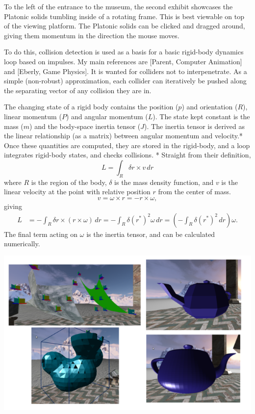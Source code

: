 \documentclass{article}
\begin{document}
To the left of the entrance to the museum, the second exhibit showcases the Platonic solids tumbling inside of a rotating frame. This is best viewable on top of the viewing platform.
The Platonic solids can be clicked and dragged around, giving them momentum in the direction the mouse moves.

To do this, collision detection is used as a basis for a basic rigid-body dynamics loop based on impulses. My main references are [Parent, Computer Animation] and [Eberly, Game Physics].
It is wanted for colliders not to interpenetrate. As a simple (non-robust) approximation, each collider can iteratively be pushed along the separating vector of any collision they are in.

The changing state of a rigid body contains the position ($p$) and orientation ($R$), linear momentum ($P$) and angular momentum ($L$). The state kept constant is the mass ($m$)
and the body-space inertia tensor ($J$). The inertia tensor is derived as the linear relationship (as a matrix) between angular momentum and velocity.*
Once these quantities are computed, they are stored in the rigid-body, and a loop integrates rigid-body states, and checks collisions.
\vskip 0.1in
{*\scriptsize
Straight from their definition,
$$L = \int_R \delta r \times v\, dr$$
where $R$ is the region of the body, $\delta$ is the mass density function, and $v$ is the linear velocity at the point with relative position $r$ from the center of mass.
$$v = \omega \times r = -r \times \omega,$$
giving
\begin{align*}
    L &= -\int_R \delta r \times (r \times \omega)\, dr
      = -\int_R \delta (r^*)^2 \omega\, dr
      = \left(-\int_R \delta (r^*)^2\, dr\right) \omega.
\end{align*}
The final term acting on $\omega$ is the inertia tensor, and can be calculated numerically.}

\begin{center}\includegraphics[width=\linewidth]{screenshots/surfaces.png}\end{center}
\end{document}
